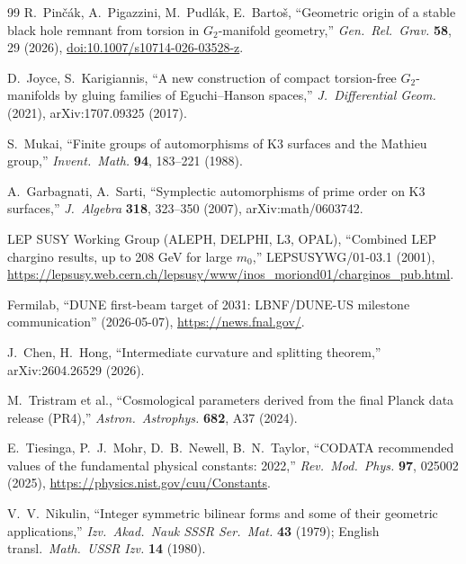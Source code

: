 \begin{thebibliography}{99}
 R.~Pin\v{c}\'ak, A.~Pigazzini, M.~Pudl\'ak, E.~Barto\v{s}, ``Geometric origin of a stable black hole remnant from torsion in $G_2$-manifold geometry,'' \textit{Gen.\ Rel.\ Grav.} \textbf{58}, 29 (2026), \href{https://doi.org/10.1007/s10714-026-03528-z}{doi:10.1007/s10714-026-03528-z}.

 D.~Joyce, S.~Karigiannis, ``A new construction of compact torsion-free $G_2$-manifolds by gluing families of Eguchi--Hanson spaces,'' \textit{J.\ Differential Geom.} (2021), arXiv:1707.09325 (2017).

 S.~Mukai, ``Finite groups of automorphisms of K3 surfaces and the Mathieu group,'' \textit{Invent.\ Math.} \textbf{94}, 183--221 (1988).

 A.~Garbagnati, A.~Sarti, ``Symplectic automorphisms of prime order on K3 surfaces,'' \textit{J.\ Algebra} \textbf{318}, 323--350 (2007), arXiv:math/0603742.

 LEP SUSY Working Group (ALEPH, DELPHI, L3, OPAL), ``Combined LEP chargino results, up to 208 GeV for large $m_0$,'' LEPSUSYWG/01-03.1 (2001), \url{https://lepsusy.web.cern.ch/lepsusy/www/inos_moriond01/charginos_pub.html}.

 Fermilab, ``DUNE first-beam target of 2031: LBNF/DUNE-US milestone communication'' (2026-05-07), \url{https://news.fnal.gov/}.

 J.~Chen, H.~Hong, ``Intermediate curvature and splitting theorem,'' arXiv:2604.26529 (2026).

 M.~Tristram et al., ``Cosmological parameters derived from the final Planck data release (PR4),'' \textit{Astron.\ Astrophys.} \textbf{682}, A37 (2024).

 E.~Tiesinga, P.~J.~Mohr, D.~B.~Newell, B.~N.~Taylor, ``CODATA recommended values of the fundamental physical constants: 2022,'' \textit{Rev.\ Mod.\ Phys.} \textbf{97}, 025002 (2025), \url{https://physics.nist.gov/cuu/Constants}.

 V.~V.~Nikulin, ``Integer symmetric bilinear forms and some of their geometric applications,'' \textit{Izv.\ Akad.\ Nauk SSSR Ser.\ Mat.} \textbf{43} (1979); English transl.\ \textit{Math.\ USSR Izv.} \textbf{14} (1980).

\end{thebibliography}
